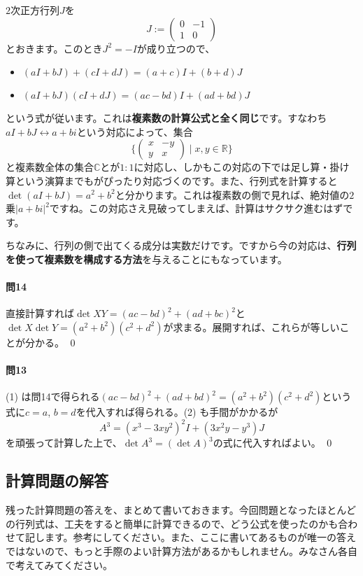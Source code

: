 $2$次正方行列$J$を
\[
J:=
\begin{pmatrix}
0 & -1 \\
1 & 0
\end{pmatrix}
\]
とおきます。このとき$J^2 = -I$が成り立つので、
\begin{itemize}
\item $(aI + bJ) + (cI + dJ) = (a + c)I + (b + d)J$
\item $(aI + bJ)(cI + dJ) = (ac -bd) I + (ad + bd)J$
\end{itemize}
という式が従います。これは\textbf{複素数の計算公式と全く同じ}です。すなわち$aI + bJ \leftrightarrow a + bi$という対応によって、集合
\[
\Biggl\{
\begin{pmatrix}
x & -y \\
y & x
\end{pmatrix}
\mid x, y \in \mathbb{R}
\Biggr\}
\]
と複素数全体の集合$\mathbb{C}$とが$1:1$に対応し、しかもこの対応の下では足し算・掛け算という演算までもがぴったり対応づくのです。また、行列式を計算すると$\det (aI + bJ) = a^2 + b^2$と分かります。これは複素数の側で見れば、絶対値の$2$乗$|a + bi|^2$ですね。この対応さえ見破ってしまえば、計算はサクサク進むはずです。

ちなみに、行列の側で出てくる成分は実数だけです。ですから今の対応は、\textbf{行列を使って複素数を構成する方法}を与えることにもなっています。

\paragraph{問14} 直接計算すれば$\det XY = (ac - bd)^2 + (ad + bc)^2$と$\det X \det Y = (a^2 + b^2)(c^2 + d^2)$が求まる。展開すれば、これらが等しいことが分かる。 \qed

\paragraph{問13} (1) は問14で得られる$(ac - bd)^2 + (ad + bd)^2 = (a^2 + b^2)(c^2 + d^2)$という式に$c = a$, $b = d$を代入すれば得られる。(2) も手間がかかるが
\[
A^3 = (x^3 -3xy^2)^2 I + (3x^2 y - y^3)J
\]
を頑張って計算した上で、$\det A^3 = (\det A)^3$の式に代入すればよい。 \qed

\subsection{計算問題の解答}

残った計算問題の答えを、まとめて書いておきます。今回問題となったほとんどの行列式は、工夫をすると簡単に計算できるので、どう公式を使ったのかも合わせて記します。参考にしてください。また、ここに書いてあるものが唯一の答えではないので、もっと手際のよい計算方法があるかもしれません。みなさん各自で考えてみてください。

